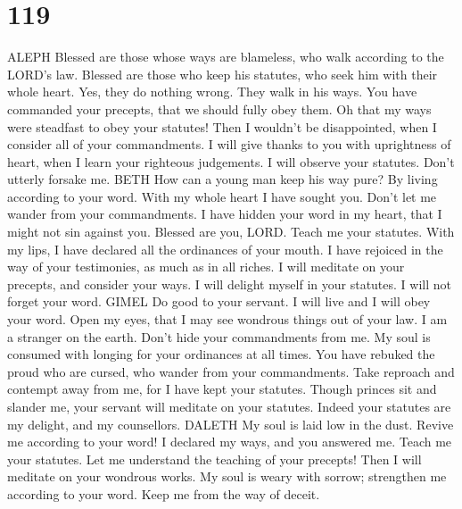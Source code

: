 \hypertarget{section-109}{%
\section{119}\label{section-109}}

ALEPH  Blessed are those whose ways are blameless, who walk
according to the LORD's law.  Blessed are those who keep his
statutes, who seek him with their whole heart.  Yes, they do
nothing wrong. They walk in his ways.  You have commanded
your precepts, that we should fully obey them.  Oh that my
ways were steadfast to obey your statutes!  Then I wouldn't
be disappointed, when I consider all of your commandments. 
I will give thanks to you with uprightness of heart, when I learn your
righteous judgements.  I will observe your statutes. Don't
utterly forsake me. BETH  How can a young man keep his way
pure? By living according to your word.  With my whole
heart I have sought you. Don't let me wander from your commandments.
 I have hidden your word in my heart, that I might not sin
against you.  Blessed are you, LORD. Teach me your
statutes.  With my lips, I have declared all the ordinances
of your mouth.  I have rejoiced in the way of your
testimonies, as much as in all riches.  I will meditate on
your precepts, and consider your ways.  I will delight
myself in your statutes. I will not forget your word. GIMEL
 Do good to your servant. I will live and I will obey your
word.  Open my eyes, that I may see wondrous things out of
your law.  I am a stranger on the earth. Don't hide your
commandments from me.  My soul is consumed with longing for
your ordinances at all times.  You have rebuked the proud
who are cursed, who wander from your commandments.  Take
reproach and contempt away from me, for I have kept your statutes.
 Though princes sit and slander me, your servant will
meditate on your statutes.  Indeed your statutes are my
delight, and my counsellors. DALETH  My soul is laid low in
the dust. Revive me according to your word!  I declared my
ways, and you answered me. Teach me your statutes.  Let me
understand the teaching of your precepts! Then I will meditate on your
wondrous works.  My soul is weary with sorrow; strengthen
me according to your word.  Keep me from the way of deceit.

